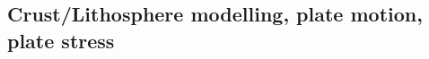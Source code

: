 \cite{yufl85}
\cite{loja95}
\cite{coli06}
\cite{wamg10}\cite{golw00}\cite{stgb10}\cite{cobe10}
\cite{algs12}\cite{roct12}\cite{crtm12}
\cite{ghbh13}\cite{yahb13}
\cite{macs16}
\cite{hulz18}\cite{osss18b}

\subsection{Crust/Lithosphere modelling, plate motion, plate stress}


